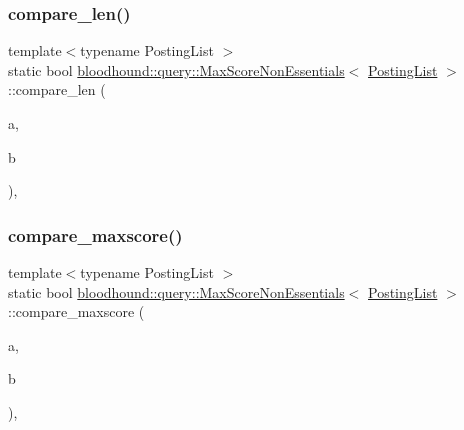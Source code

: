 \subsubsection{\texorpdfstring{compare\+\_\+len()}{compare\_len()}}
{\footnotesize\ttfamily template$<$typename Posting\+List $>$ \\
static bool \mbox{\hyperlink{classbloodhound_1_1query_1_1MaxScoreNonEssentials}{bloodhound\+::query\+::\+Max\+Score\+Non\+Essentials}}$<$ \mbox{\hyperlink{classbloodhound_1_1PostingList}{Posting\+List}} $>$\+::compare\+\_\+len (\begin{DoxyParamCaption}\item[{const \mbox{\hyperlink{classbloodhound_1_1PostingList}{Posting\+List}} \&}]{a,  }\item[{const \mbox{\hyperlink{classbloodhound_1_1PostingList}{Posting\+List}} \&}]{b }\end{DoxyParamCaption})\hspace{0.3cm}{\ttfamily [inline]}, {\ttfamily [static]}}

\mbox{\label{classbloodhound_1_1query_1_1MaxScoreNonEssentials_a758b1b31a3ec9b563978ed7a11e3987c}} 
\subsubsection{\texorpdfstring{compare\+\_\+maxscore()}{compare\_maxscore()}}
{\footnotesize\ttfamily template$<$typename Posting\+List $>$ \\
static bool \mbox{\hyperlink{classbloodhound_1_1query_1_1MaxScoreNonEssentials}{bloodhound\+::query\+::\+Max\+Score\+Non\+Essentials}}$<$ \mbox{\hyperlink{classbloodhound_1_1PostingList}{Posting\+List}} $>$\+::compare\+\_\+maxscore (\begin{DoxyParamCaption}\item[{const \mbox{\hyperlink{classbloodhound_1_1PostingList}{Posting\+List}} \&}]{a,  }\item[{const \mbox{\hyperlink{classbloodhound_1_1PostingList}{Posting\+List}} \&}]{b }\end{DoxyParamCaption})\hspace{0.3cm}{\ttfamily [inline]}, {\ttfamily [static]}}


